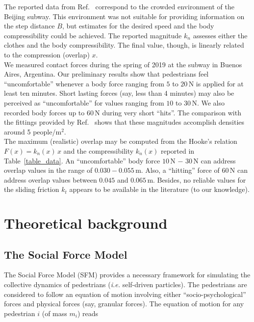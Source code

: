\documentclass[preprint,12pt]{elsarticle}
\begin{document}
The reported data from Ref.~\cite{song_2019} correspond to the crowded
environment of the Beijing subway. This environment was not suitable for
providing information on the step distance $B$, but estimates for the  desired
speed and the body compressibility could be achieved. The reported  magnitude
$k_n$ assesses either the clothes and the body compressibility. The  final
value, though, is linearly related to the compression (overlap) $x$. \\

We measured  contact forces during the spring of 2019 at the subway in Buenos
Aires,  Argentina. Our preliminary results show that pedestrians feel
``uncomfortable''  whenever a body force ranging from $5$ to $20\,$N is applied
for at least ten  minutes. Short lasting forces (say, less than 4 minutes) may
also be perceived  as ``uncomfortable'' for values ranging from $10$ to $30\,$N.
We also recorded body  forces up to $60\,$N during very short ``hits''. The
comparison with the  fittings provided by Ref.~\cite{song_2019} shows that these
magnitudes  accomplish densities around 5 people/m$^2$.     \\

The maximum (realistic) overlap may be computed from the Hooke's relation
$F(x)=k_n(x)\,x$ and the compressibility $k_n(x)$ reported in
Table~\ref{table_data}.  An ``uncomfortable'' body force  $10\,$N $-$ $30\,$N
can address overlap values in the  range of $0.030-0.055\,$m. Also, a
``hitting'' force of $60\,$N can address  overlap values between $0.045$ and
$0.065\,$m. Besides, no reliable values for the sliding friction $k_t$ appears
to be available in the literature (to our knowledge).\\


\section{\label{background}Theoretical background}

\subsection{\label{sfm}The Social Force Model}

The Social Force Model (SFM) provides a necessary framework for simulating  the
collective dynamics of pedestrians (\textit{i.e.} self-driven particles). The
pedestrians are considered to follow an equation of motion involving  either
``socio-psychological'' forces and physical forces (say, granular  forces). The
equation of motion for any pedestrian $i$ (of mass $m_i$) reads
\end{document}
